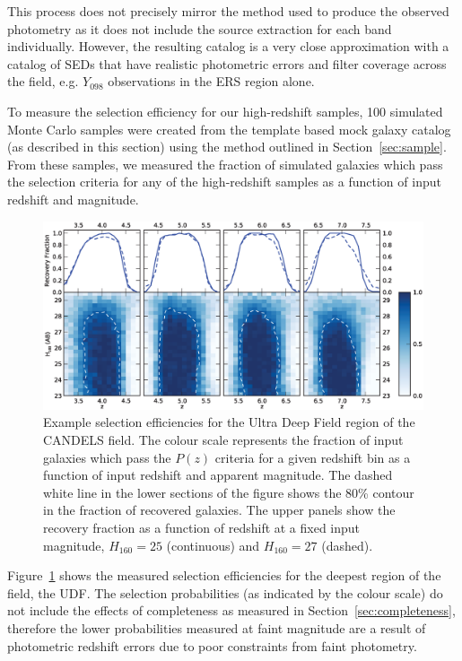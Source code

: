 This process does not precisely mirror the method used to produce the observed photometry as it does not include the source extraction for each band individually. However, the resulting catalog is a very close approximation with a catalog of SEDs that have realistic photometric errors and filter coverage across the field, e.g. $Y_{098}$ observations in the ERS region alone. 

To measure the selection efficiency for our high-redshift samples, 100 simulated Monte Carlo samples were created from the template based mock galaxy catalog (as described in this section) using the method outlined in Section~\ref{sec:sample}. From these samples, we measured the fraction of simulated galaxies which pass the selection criteria for any of the high-redshift samples as a function of input redshift and magnitude.

\begin{figure}
\includegraphics[width=180mm]{plots/fig4.eps}
\caption{Example selection efficiencies for the Ultra Deep Field region of the CANDELS field. The colour scale represents the fraction of input galaxies which pass the $P(z)$ criteria for a given redshift bin as a function of input redshift and apparent magnitude. The dashed white line in the lower sections of the figure shows the 80\% contour in the fraction of recovered galaxies. The upper panels show the recovery fraction as a function of redshift at a fixed input magnitude, $H_{160} = 25$ (continuous) and $H_{160} = 27$ (dashed).}
\label{fig:selection}
\end{figure}

Figure~\ref{fig:selection} shows the measured selection efficiencies for  the deepest region of the field, the UDF. The selection probabilities (as indicated by the colour scale) do not include the effects of completeness as measured in Section~\ref{sec:completeness}, therefore the lower probabilities measured at faint magnitude are a result of photometric redshift errors due to poor constraints from faint photometry.


